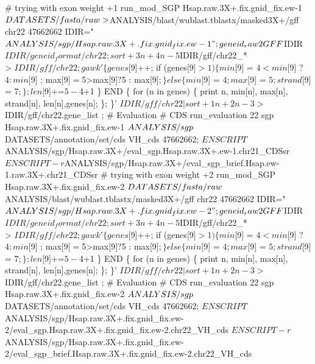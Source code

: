 \documentclass[11pt]{article}
\begin{document}
\nwenddocs{}\endmoddef
# trying with exon weight +1
run_mod_SGP Hsap.raw.3X+.fix.gnid_fix.ew-1 $DATASETS/fasta/raw \\
>         $ANALYSIS/blast/wublast.tblastx/masked3X+/gff chr22 47662662
IDIR="$ANALYSIS/sgp/Hsap.raw.3X+.fix.gnid_fix.ew-1" ;
geneid_raw2GFF $IDIR $IDIR/geneid_format/chr22 ;
sort +3n +4n -5 $IDIR/gff/chr22_* \\
              > $IDIR/gff/chr22 ; 
gawk '\{
      genes[$9]++;
      if (genes[$9]>1) \{
        min[$9] = $4<min[$9] ? $4 : min[$9] ;
        max[$9] = $5>max[$9] ? $5 : max[$9] ;
      \} else \{
        min[$9] = $4 ;
        max[$9] = $5 ;
        strand[$9] = $7;
      \};
      len[$9]+=$5-$4+1
    \}
    END \{
      for (n in genes) \{
        print n, min[n], max[n], strand[n], len[n],genes[n];
      \};
    \}' $IDIR/gff/chr22 | sort +1n +2n -3 > $IDIR/gff/chr22.gene_list ;
# Evaluation 
# CDS
run_evaluation 22 sgp Hsap.raw.3X+.fix.gnid_fix.ew-1 $ANALYSIS/sgp \\
     $DATASETS/annotation/set/cds VH_cds 47662662;
$ENSCRIPT  $ANALYSIS/sgp/Hsap.raw.3X+/eval_sgp.Hsap.raw.3X+.ew-1.chr21_CDSsr 
$ENSCRIPT -r $ANALYSIS/sgp/Hsap.raw.3X+/eval_sgp_brief.Hsap.ew-1.raw.3X+.chr21_CDSsr 
# trying with exon weight +2
run_mod_SGP Hsap.raw.3X+.fix.gnid_fix.ew-2 $DATASETS/fasta/raw \\
       $ANALYSIS/blast/wublast.tblastx/masked3X+/gff chr22 47662662
IDIR="$ANALYSIS/sgp/Hsap.raw.3X+.fix.gnid_fix.ew-2" ;
geneid_raw2GFF $IDIR $IDIR/geneid_format/chr22 ;
sort +3n +4n -5 $IDIR/gff/chr22_* \\
              > $IDIR/gff/chr22 ; 
gawk '\{
      genes[$9]++;
      if (genes[$9]>1) \{
        min[$9] = $4<min[$9] ? $4 : min[$9] ;
        max[$9] = $5>max[$9] ? $5 : max[$9] ;
      \} else \{
        min[$9] = $4 ;
        max[$9] = $5 ;
        strand[$9] = $7;
      \};
      len[$9]+=$5-$4+1
    \}
    END \{
      for (n in genes) \{
        print n, min[n], max[n], strand[n], len[n],genes[n];
      \};
    \}' $IDIR/gff/chr22 | sort +1n +2n -3 > $IDIR/gff/chr22.gene_list ;
# Evaluation 
# CDS
run_evaluation 22 sgp Hsap.raw.3X+.fix.gnid_fix.ew-2 $ANALYSIS/sgp \\
     $DATASETS/annotation/set/cds VH_cds 47662662;
$ENSCRIPT  $ANALYSIS/sgp/Hsap.raw.3X+.fix.gnid_fix.ew-2/eval_sgp.Hsap.raw.3X+.fix.gnid_fix.ew-2.chr22_VH_cds
$ENSCRIPT -r $ANALYSIS/sgp/Hsap.raw.3X+.fix.gnid_fix.ew-2/eval_sgp_brief.Hsap.raw.3X+.fix.gnid_fix.ew-2.chr22_VH_cds
\end{document}
